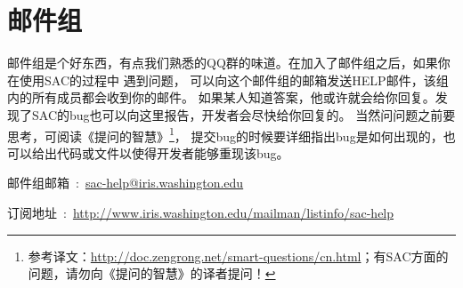 \section{邮件组}
邮件组是个好东西，有点我们熟悉的QQ群的味道。在加入了邮件组之后，如果你在使用SAC的过程中
遇到问题，
可以向这个邮件组的邮箱发送HELP邮件，该组内的所有成员都会收到你的邮件。
如果某人知道答案，他或许就会给你回复。发现了SAC的bug也可以向这里报告，开发者会尽快给你回复的。
当然问问题之前要思考，可阅读《提问的智慧》\footnote{参考译文：\url{http://doc.zengrong.net/smart-questions/cn.html}；有SAC方面的问题，请勿向《提问的智慧》的译者提问！}，
提交bug的时候要详细指出bug是如何出现的，也可以给出代码或文件以使得开发者能够重现该bug。

邮件组邮箱~:~\url{sac-help@iris.washington.edu}

订阅地址~:~\small{\url{http://www.iris.washington.edu/mailman/listinfo/sac-help}}
